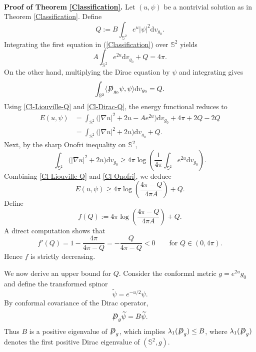 \documentclass[a4paper, 12pt]{article}
\def\slashiii#1{\setbox0=\hbox{$#1$}#1\hskip-\wd0\hbox to\wd0{\hss\sl/\/\hss}}
\begin{document}
\

\noindent\textbf{Proof of Theorem \ref{Classification}. }
Let \((u,\psi)\) be a nontrivial solution as in Theorem \ref{Classification}. Define
\[
Q:=B\int_{\mathbb{S}^2}e^u|\psi|^2{\text{d}}v_{g_0}.
\]
Integrating the first equation in (\ref{Classification}) over \(\mathbb{S}^2\) yields
\begin{equation}\label{Cl-Liouville-Q}
	A\int_{\mathbb{S}^2}e^{2u}{\text{d}}v_{g_0}+Q=4\pi.
\end{equation}
On the other hand, multiplying the Dirac equation by \(\psi\) and integrating gives
\begin{equation}\label{Cl-Dirac-Q}
	\int_{\mathbb{S}^2}\langle \slashiii{D}_{g_0}\psi,\psi\rangle{\text{d}}v_{g_0}=Q.
\end{equation}
Using  \eqref{Cl-Liouville-Q} and \eqref{Cl-Dirac-Q}, the energy functional reduces to
\[
\begin{aligned}
	E(u,\psi)	&=	\int_{\mathbb{S}^2}
	\Big(	|\nabla u|^2+2u-Ae^{2u}
	\Big){\text{d}}v_{g_0}	+4\pi
	+2Q-2Q		\\
	&=\int_{\mathbb{S}^2}
	\Big(|\nabla u|^2+2u		\Big){\text{d}}v_{g_0}+Q.
\end{aligned}
\]
Next, by the sharp Onofri inequality on \(\mathbb{S}^2\),
\begin{equation}\label{Cl-Onofri}
	\int_{\mathbb{S}^2}\Big(	|\nabla u|^2+2u
	\Big){\text{d}}v_{g_0}\ge	4\pi
	\log\left(	\frac1{4\pi}		\int_{\mathbb{S}^2}e^{2u}{\text{d}}v_{g_0}
	\right).
\end{equation}
Combining \eqref{Cl-Liouville-Q} and \eqref{Cl-Onofri}, we deduce
\begin{equation}\label{Cl-energy-low}
	E(u,\psi)\geq 4\pi\log\left(\frac{4\pi-Q}{4\pi A}	\right)	+Q.
\end{equation}
Define
\[
f(Q):=	4\pi\log\left(	\frac{4\pi-Q}{4\pi A}
\right)	+Q.
\]
A direct computation shows that
\[
f'(Q)=1-\frac{4\pi}{4\pi-Q}=-\frac{Q}{4\pi-Q}<0
\qquad\text{for }Q\in(0,4\pi).
\]
Hence \(f\) is strictly decreasing.

We now derive an upper bound for \(Q\). Consider the conformal metric $g=e^{2u}g_0$ and define the transformed spinor
\[
\widetilde\psi=e^{-u/2}\psi.
\]
By conformal covariance of the Dirac operator,
\[
\slashiii{D}_g\widetilde\psi=B\widetilde\psi.
\]
Thus \(B\) is a positive eigenvalue of \(\slashiii{D}_g\), which implies $\lambda_1(\slashiii{D}_g)\le B$, where \(\lambda_1(\slashiii{D}_g)\) denotes the first positive Dirac eigenvalue of \((\mathbb{S}^2,g)\).
\end{document}
